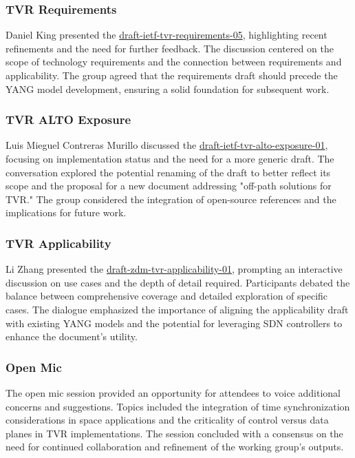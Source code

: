 \documentclass{article}
\begin{document}
\subsubsection{TVR Requirements}
Daniel King presented the \href{https://datatracker.ietf.org/doc/html/draft-ietf-tvr-requirements-05}{draft-ietf-tvr-requirements-05}, highlighting recent refinements and the need for further feedback. The discussion centered on the scope of technology requirements and the connection between requirements and applicability. The group agreed that the requirements draft should precede the YANG model development, ensuring a solid foundation for subsequent work.

\subsubsection{TVR ALTO Exposure}
Luis Mieguel Contreras Murillo discussed the \href{https://datatracker.ietf.org/doc/html/draft-ietf-tvr-alto-exposure-01}{draft-ietf-tvr-alto-exposure-01}, focusing on implementation status and the need for a more generic draft. The conversation explored the potential renaming of the draft to better reflect its scope and the proposal for a new document addressing "off-path solutions for TVR." The group considered the integration of open-source references and the implications for future work.

\subsubsection{TVR Applicability}
Li Zhang presented the \href{https://datatracker.ietf.org/doc/html/draft-zdm-tvr-applicability-01}{draft-zdm-tvr-applicability-01}, prompting an interactive discussion on use cases and the depth of detail required. Participants debated the balance between comprehensive coverage and detailed exploration of specific cases. The dialogue emphasized the importance of aligning the applicability draft with existing YANG models and the potential for leveraging SDN controllers to enhance the document's utility.

\subsubsection{Open Mic}
The open mic session provided an opportunity for attendees to voice additional concerns and suggestions. Topics included the integration of time synchronization considerations in space applications and the criticality of control versus data planes in TVR implementations. The session concluded with a consensus on the need for continued collaboration and refinement of the working group's outputs.
\end{document}
